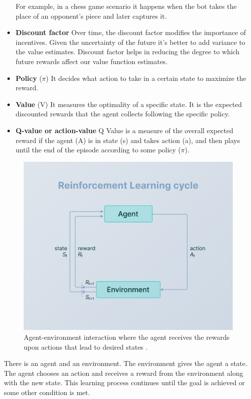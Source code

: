 \documentclass{article}
\begin{document}
\begin{itemize}
For example, in a chess game scenario it happens when the bot takes the place of an opponent's piece and later captures it.
\item \textbf{Discount factor} Over time, the discount factor modifies the importance of incentives. Given the uncertainty of the future it’s better to add variance to the value estimates. Discount factor helps in reducing the degree to which future rewards affect our value function estimates.
\item \textbf{Policy} ($\pi$) It decides what action to take in a certain state to maximize the reward.
\item \textbf{Value} (V) It measures the optimality of a specific state. It is the expected discounted rewards that the agent collects following the specific policy.
\item \textbf{Q-value or action-value} Q Value is a measure of the overall expected reward if the agent (A) is in state (s) and takes action (a), and then plays until the end of the episode according to some policy ($\pi$).
\end{itemize}

\begin{figure}
\centering
\includegraphics[width=1\textwidth]{image3.png}
\caption{Agent-environment interaction where the agent receives the rewards upon actions that lead to desired states \cite{sutton2018reinforcement}.}
\label{fig: Agent-environment interaction in RL.}
\end{figure}

There is an agent and an environment. The environment gives the agent a state. The agent chooses an action and receives a reward from the environment along with the new state. This learning process continues until the goal is achieved or some other condition is met.
\end{document}
